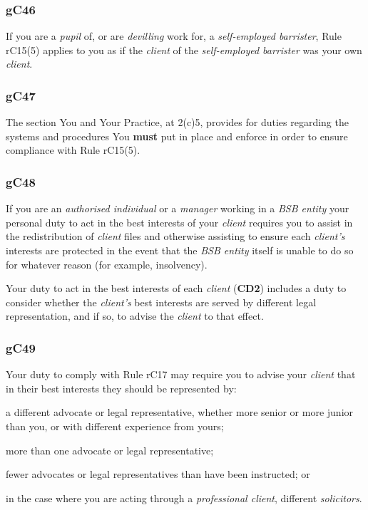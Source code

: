 \subsubsection{\color{darkgrey}gC46}

If you are a \emph{pupil} of, or are \emph{devilling} work for, a
\emph{self-employed barrister}, Rule rC15(5) applies to you as if the
\emph{client} of the \emph{self-employed barrister} was your own
\emph{client}.

\subsubsection{\color{darkgrey}gC47}

The section You and Your Practice, at 2(c)5, provides for duties
regarding the systems and procedures You \textcolor{myred}{\textbf{must}} put in place and enforce
in order to ensure compliance with Rule rC15(5).

\subsubsection{\color{darkgrey}gC48}

If you are an \emph{authorised individual} or a \emph{manager} working
in a \emph{BSB entity} your personal duty to act in the best interests
of your \emph{client} requires you to assist in the redistribution of
\emph{client} files and otherwise assisting to ensure each
\emph{client's} interests are protected in the event that the \emph{BSB
entity} itself is unable to do so for whatever reason (for example,
insolvency).



Your duty to act in the best interests of each \emph{client} (\textcolor{mygold}{\textbf{CD2}})
includes a duty to consider whether the \emph{client's} best interests
are served by different legal representation, and if so, to advise the
\emph{client} to that effect.




\subsubsection{\color{darkgrey}gC49}

Your duty to comply with Rule rC17 may require you to advise your
\emph{client} that in their best interests they should be represented
by:
\begin{numlist}
\item a different advocate or legal representative, whether more senior or
more junior than you, or with different experience from yours;

\item more than one advocate or legal representative;

\item fewer advocates or legal representatives than have been instructed;
or

\item in the case where you are acting through a \emph{professional
client}, different \emph{solicitors}.
\end{numlist}

